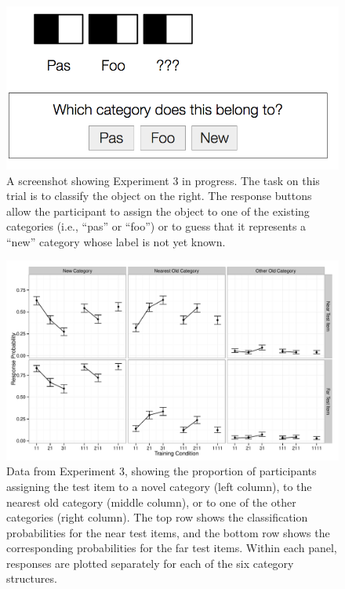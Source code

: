\documentclass[doc]{apa6}
\begin{document}
\begin{figure}[p]
\begin{center}
\includegraphics[scale=.25]{display3.png}
\caption{A screenshot showing Experiment 3 in progress. The task on this trial is to classify the object on the right. The response buttons allow the participant to assign the object to one of the existing categories (i.e., ``pas'' or ``foo'') or to guess that it represents a ``new'' category whose label is not yet known.}
\label{fig:display3}
\end{center}
\end{figure}

\begin{figure}[p]
\begin{center}
\includegraphics[scale=.5]{data3.pdf}
\caption{Data from Experiment 3, showing the proportion of participants assigning the test item to a novel category (left column), to the nearest old category (middle column), or to one of the other categories (right column). The top row shows the classification probabilities for the near test items, and the bottom row shows the corresponding probabilities for the far test items. Within each panel, responses are plotted separately for each of the six category structures.}
\label{fig:exp3data}
\end{center}
\end{figure}
\end{document}
